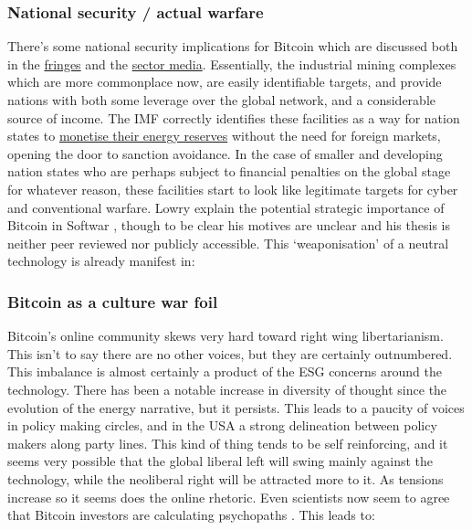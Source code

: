 \begin{itemize}
\subsubsection{National security / actual warfare}
There's some national security implications for Bitcoin which are discussed both in the \href{https://twitter.com/JasonPLowery/status/1512775981693648897?}{fringes} and the \href{https://www.coindesk.com/layer2/2022/04/04/why-bitcoin-mining-is-a-matter-of-national-security/}{sector media}. Essentially, the industrial mining complexes which are more commonplace now, are easily identifiable targets, and provide nations with both some leverage over the global network, and a considerable source of income. The IMF correctly identifies these facilities as a way for nation states to \href{https://www.imf.org/en/Publications/GFSR/Issues/2022/04/19/global-financial-stability-report-april-2022}{monetise their energy reserves} without the need for foreign markets, opening the door to sanction avoidance. In the case of smaller and developing nation states who are perhaps subject to financial penalties on the global stage for whatever reason, these facilities start to look like legitimate targets for cyber and conventional warfare. Lowry explain the potential strategic importance of Bitcoin in Softwar \cite{Lowery2023}, though to be clear his motives are unclear and his thesis is neither peer reviewed nor publicly accessible. This `weaponisation' of a neutral technology is already manifest in:
\subsubsection{Bitcoin as a culture war foil}
Bitcoin's online community skews very hard toward right wing libertarianism. This isn't to say there are no other voices, but they are certainly outnumbered. This imbalance is almost certainly a product of the ESG concerns around the technology. There has been a notable increase in diversity of thought since the evolution of the energy narrative, but it persists. This leads to a paucity of voices in policy making circles, and in the USA a strong delineation between policy makers along party lines. This kind of thing tends to be self reinforcing, and it seems very possible that the global liberal left will swing mainly against the technology, while the neoliberal right will be attracted more to it. As tensions increase so it seems does the online rhetoric. Even scientists now seem to agree that Bitcoin investors are calculating psychopaths \cite{martin2022dark}. This leads to:

\end{itemize}
